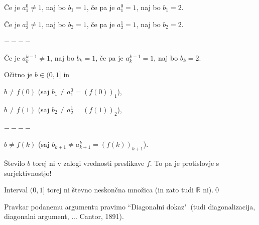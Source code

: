 \documentclass[11pt,paper=b5,DIV=13,headinclude,footinclude]{scrbook}
\begin{document}
Če je $a_1^0 \neq 1$, naj bo $b_1 = 1$, če pa je $a_1^0 = 1$, naj bo $b_1 = 2$.

Če je $a_2^1 \neq 1$, naj bo $b_2 = 1$, če pa je $a_2^1 = 1$, naj bo $b_2 = 2$.

$----$

Če je $a_k^{k-1} \neq 1$, naj bo $b_k = 1$, če pa je $a_k^{k-1} = 1$, naj bo $b_k = 2$.

Očitno je $b\in (0,1]$ in

$b\neq f(0)$ (saj $b_1 \neq a^0_1 = (f(0))_1$),

$b\neq f(1)$ (saj $b_2 \neq a^1_2 = (f(1))_2$),

$----$

$b\neq f(k)$ (saj $b_{k+1} \neq a^{k}_{k+1} = (f(k))_{k+1}$).

Število $b$ torej ni v zalogi vrednosti preslikave $f$. To pa je protislovje s surjektivnostjo!

Interval $(0,1]$ torej ni števno neskončna množica (in zato tudi $\mathbb{R}$ ni).\qed

\medskip
Pravkar podanemu argumentu pravimo ``Diagonalni dokaz"~(tudi diagonalizacija, diagonalni argument, ...
Cantor, 1891).

\bigskip
\end{document}

